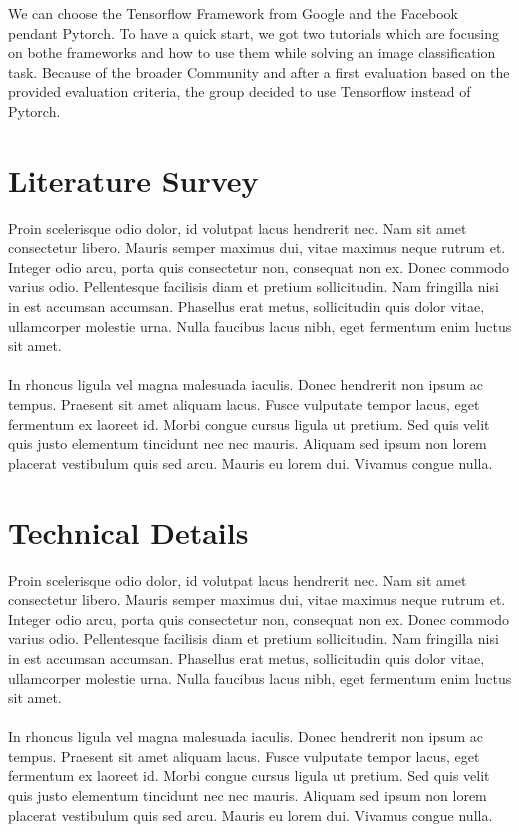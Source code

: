 \documentclass[journal]{IEEEtran}
\begin{document}
\noindent We can choose the Tensorflow Framework from Google and the Facebook pendant Pytorch. To have a quick start, we got two tutorials which are focusing on bothe frameworks and how to use them while solving an image classification task. Because of the broader Community and after a first evaluation based on the provided evaluation criteria, the group decided to use Tensorflow instead of Pytorch.
\section{Literature Survey}
Proin scelerisque odio dolor, id volutpat lacus hendrerit nec. Nam sit amet consectetur libero. Mauris semper maximus dui, vitae maximus neque rutrum et. Integer odio arcu, porta quis consectetur non, consequat non ex. Donec commodo varius odio. Pellentesque facilisis diam et pretium sollicitudin. Nam fringilla nisi in est accumsan accumsan. Phasellus erat metus, sollicitudin quis dolor vitae, ullamcorper molestie urna. Nulla faucibus lacus nibh, eget fermentum enim luctus sit amet.\\\\In rhoncus ligula vel magna malesuada iaculis. Donec hendrerit non ipsum ac tempus. Praesent sit amet aliquam lacus. Fusce vulputate tempor lacus, eget fermentum ex laoreet id. Morbi congue cursus ligula ut pretium. Sed quis velit quis justo elementum tincidunt nec nec mauris. Aliquam sed ipsum non lorem placerat vestibulum quis sed arcu. Mauris eu lorem dui. Vivamus congue nulla.
%
%
\section{Technical Details}
Proin scelerisque odio dolor, id volutpat lacus hendrerit nec. Nam sit amet consectetur libero. Mauris semper maximus dui, vitae maximus neque rutrum et. Integer odio arcu, porta quis consectetur non, consequat non ex. Donec commodo varius odio. Pellentesque facilisis diam et pretium sollicitudin. Nam fringilla nisi in est accumsan accumsan. Phasellus erat metus, sollicitudin quis dolor vitae, ullamcorper molestie urna. Nulla faucibus lacus nibh, eget fermentum enim luctus sit amet.\\\\In rhoncus ligula vel magna malesuada iaculis. Donec hendrerit non ipsum ac tempus. Praesent sit amet aliquam lacus. Fusce vulputate tempor lacus, eget fermentum ex laoreet id. Morbi congue cursus ligula ut pretium. Sed quis velit quis justo elementum tincidunt nec nec mauris. Aliquam sed ipsum non lorem placerat vestibulum quis sed arcu. Mauris eu lorem dui. Vivamus congue nulla.
%
%
\end{document}
